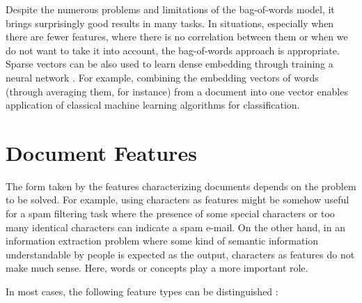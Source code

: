 Despite the numerous problems and limitations of the bag-of-words model,
it brings surprisingly good results in many tasks. In situations, especially when
there are fewer features, where there is no correlation between them or when we
do not want to take it into account, the bag-of-words approach is appropriate.
Sparse vectors can be also used to learn dense embedding through training a
neural network \cite{ref101}. For example, combining the embedding vectors of words
(through averaging them, for instance) from a document into one vector enables
application of classical machine learning algorithms for classification.

\section{Document Features}

The form taken by the features characterizing documents depends on the problem to be solved. For example, using characters as features might be somehow
useful for a spam filtering task where the presence of some special characters
or too many identical characters can indicate a spam e-mail. On the other hand,
in an information extraction problem where some kind of semantic information
understandable by people is expected as the output, characters as features do not
make much sense. Here, words or concepts play a more important role.

In most cases, the following feature types can be distinguished \cite{ref87}:

